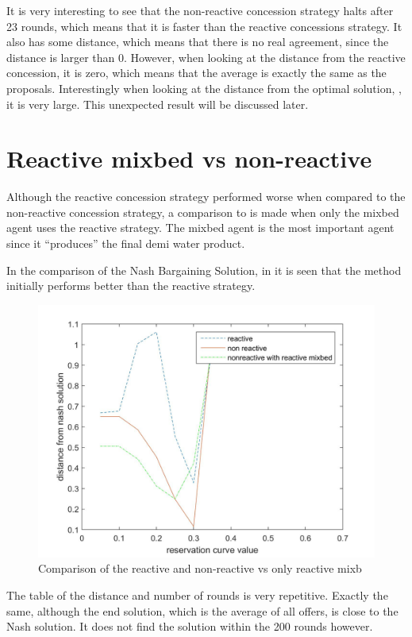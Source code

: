 It is very interesting to see that the non-reactive concession strategy halts after 23 rounds, which means that it is faster than the reactive concessions strategy. It also has some distance, which means that there is no real agreement, since the distance is larger than 0. However, when looking at the distance from the reactive concession, it is zero, which means that the average is exactly the same as the proposals. Interestingly when looking at the distance from the optimal solution, , it is very large. This unexpected result will be discussed later. 
\section{Reactive mixbed vs non-reactive }
Although the reactive concession strategy performed worse when compared to the non-reactive concession strategy, a comparison to is made when only the mixbed agent uses the reactive strategy. The mixbed agent is the most important agent since it ``produces'' the final demi water product.

In the comparison of the Nash Bargaining Solution, in  it is seen that the method initially performs better than the reactive strategy. 


\begin{figure}[h]
	\centering
	\includegraphics[width=0.9\linewidth]{img/reactivevsnonreactivevsmixbedrea}
	\caption{Comparison of the reactive and non-reactive vs only reactive mixb}
	\label{fig:reactivevsnon-reactivevsnon-reactivemxbrea}
\end{figure}

The table of the distance and number of rounds is very repetitive. Exactly the same, although the end solution, which is the average of all offers, is close to the Nash solution. It does not find the solution within the 200 rounds however.

